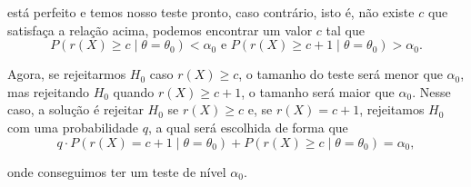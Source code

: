 \documentclass{article}
\begin{document}
\noindent está perfeito e temos nosso teste pronto, caso contrário, isto é, não existe $c$ que satisfaça a relação acima, podemos encontrar um valor $c$ tal que
\[P(r(X) \geq c \mid \theta = \theta_0) < \alpha_0 \text{ e } P(r(X) \geq c + 1 \mid \theta = \theta_0) > \alpha_0.\]

Agora, se rejeitarmos $H_0$ caso $r(X) \geq c$, o tamanho do teste será menor que $\alpha_0$, mas rejeitando $H_0$ quando $r(X) \geq c + 1$, o tamanho será maior que $\alpha_0$. Nesse caso, a solução é rejeitar $H_0$ se $r(X) \geq c$ e, se $r(X) = c + 1$, rejeitamos $H_0$ com uma probabilidade $q$, a qual será escolhida de forma que
\[q\cdot P(r(X) = c + 1 \mid \theta = \theta_0) + P(r(X) \geq c \mid \theta = \theta_0) = \alpha_0,\]

\noindent onde conseguimos ter um teste de nível $\alpha_0$.

\printbibliography
\end{document}
